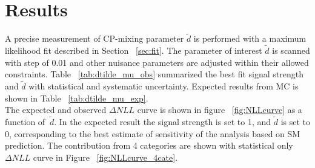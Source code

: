 \section{Results}
\label{sec:result}



A precise measurement of CP-mixing parameter $\tilde{d}$ is performed with a maximum likelihood fit described in Section ~\ref{sec:fit}. The parameter of interest $\tilde{d}$ is scanned with step of 0.01 and other nuisance parameters are adjusted within their allowed constraints. Table ~\ref{tab:dtilde_mu_obs} summarized the best fit signal strength and $\tilde{d}$ with statistical and systematic uncertainty. Expected results from MC is shown in Table ~\ref{tab:dtilde_mu_exp}. \\

The expected and observed $\Delta NLL$ curve is shown in figure ~\ref{fig:NLLcurve} as a function of $~\tilde{d}$. In the expected result the signal strength is set to 1, and $\tilde{d}$ is set to 0, corresponding to the best estimate of sensitivity of the analysis based on SM prediction. The contribution from 4 categories are shown with statistical only $\Delta NLL$ curve in Figure ~\ref{fig:NLLcurve_4cate}. 

